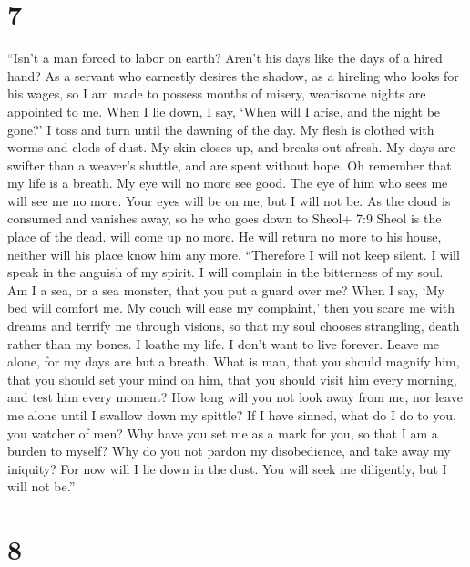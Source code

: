 \hypertarget{section-5}{%
\section{7}\label{section-5}}

 ``Isn't a man forced to labor on earth? Aren't his days
like the days of a hired hand?  As a servant who earnestly
desires the shadow, as a hireling who looks for his wages, 
so I am made to possess months of misery, wearisome nights are appointed
to me.  When I lie down, I say, `When will I arise, and the
night be gone?' I toss and turn until the dawning of the day.
 My flesh is clothed with worms and clods of dust. My skin
closes up, and breaks out afresh.  My days are swifter than
a weaver's shuttle, and are spent without hope.  Oh remember
that my life is a breath. My eye will no more see good.  The
eye of him who sees me will see me no more. Your eyes will be on me, but
I will not be.  As the cloud is consumed and vanishes away,
so he who goes down to Sheol+ 7:9 Sheol is the place of the dead. will
come up no more.  He will return no more to his house,
neither will his place know him any more.  ``Therefore I
will not keep silent. I will speak in the anguish of my spirit. I will
complain in the bitterness of my soul.  Am I a sea, or a
sea monster, that you put a guard over me?  When I say, `My
bed will comfort me. My couch will ease my complaint,' 
then you scare me with dreams and terrify me through visions,
 so that my soul chooses strangling, death rather than my
bones.  I loathe my life. I don't want to live forever.
Leave me alone, for my days are but a breath.  What is man,
that you should magnify him, that you should set your mind on him,
 that you should visit him every morning, and test him
every moment?  How long will you not look away from me, nor
leave me alone until I swallow down my spittle?  If I have
sinned, what do I do to you, you watcher of men? Why have you set me as
a mark for you, so that I am a burden to myself?  Why do
you not pardon my disobedience, and take away my iniquity? For now will
I lie down in the dust. You will seek me diligently, but I will not
be.''

\hypertarget{section-6}{%
\section{8}\label{section-6}}

